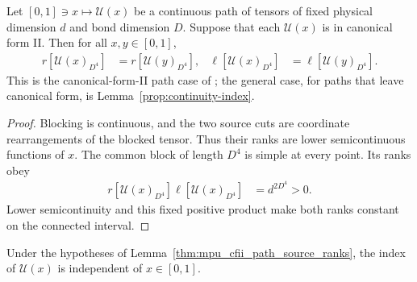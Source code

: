 \begin{lemma}
    \label{thm:mpu_cfii_path_source_ranks}
    \leanok
    Let $[0,1]\ni x\mapsto\mathcal U(x)$ be a continuous path of tensors of
    fixed physical dimension $d$ and bond dimension $D$. Suppose that each
    $\mathcal U(x)$ is in canonical form II. Then for all $x,y\in[0,1]$,
    \begin{align}
        r[\mathcal U(x)_{D^4}]    & =r[\mathcal U(y)_{D^4}],    &
        \ell[\mathcal U(x)_{D^4}] & =\ell[\mathcal U(y)_{D^4}].
    \end{align}
    This is the canonical-form-II path case of
    \cite[Proposition~IV.5]{Cirac2017MPU}; the general case, for paths that
    leave canonical form, is Lemma~\ref{prop:continuity-index}.
\end{lemma}

\begin{proof}\leanok
    Blocking is continuous, and the two source cuts are coordinate
    rearrangements of the blocked tensor. Thus their ranks are lower
    semicontinuous functions of $x$. The common block of length $D^4$ is
    simple at every point. Its ranks obey
    \begin{align}
        r[\mathcal U(x)_{D^4}]\ell[\mathcal U(x)_{D^4}]
         & =d^{2D^4}>0.
    \end{align}
    Lower semicontinuity and this fixed positive product make both ranks
    constant on the connected interval.
\end{proof}

\begin{lemma}
    \label{thm:mpu_cfii_path_index}
    \leanok
    Under the hypotheses of Lemma~\ref{thm:mpu_cfii_path_source_ranks},
    the index of $\mathcal U(x)$ is independent of $x\in[0,1]$.
\end{lemma}

